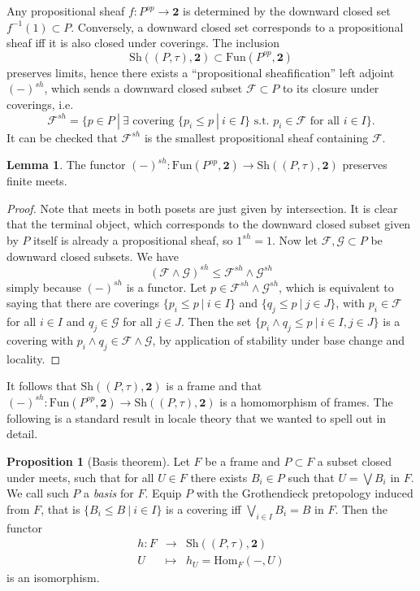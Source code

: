 \documentclass[10pt]{amsart}
\theoremstyle{definition}
\newtheorem{lemma}[theorem]{Lemma}
\newtheorem{proposition}[theorem]{Proposition}
\begin{document}
Any propositional sheaf $f : P^{op} \rightarrow \mathbf{2}$ is determined by the downward closed set $f^{-1}(1) \subset P$. Conversely, a downward closed set corresponds to a propositional sheaf iff it is also closed under coverings. The inclusion
$$\mathrm{Sh}((P,\tau), \mathbf{2}) \subset \mathrm{Fun}(P^{op}, \mathbf{2})$$
preserves limits, hence there exists a ``propositional sheafification'' left adjoint $(-)^{sh}$, which sends a downward closed subset $\mathcal{F} \subset P$ to its closure under coverings, i.e.
$$\mathcal{F}^{sh} = \{p \in P ~|~ \exists \text{ covering } \{p_i \leq p ~|~ i \in I \} \text{ s.t. } p_i \in \mathcal{F} \text{ for all } i \in I \}.$$
It can be checked that $\mathcal{F}^{sh}$ is the smallest propositional sheaf containing $\mathcal{F}$.

\begin{lemma} \label{leftadjointgeometricmorphism}
The functor $(-)^{sh} : \mathrm{Fun}(P^{op}, \mathbf{2}) \rightarrow \mathrm{Sh}((P,\tau), \mathbf{2})$
preserves finite meets.
\end{lemma}

\begin{proof} Note that meets in both posets are just given by intersection. It is clear that the terminal object, which corresponds to the downward closed subset given by $P$ itself is already a propositional sheaf, so $1^{sh} = 1$. Now let $\mathcal{F}, \mathcal{G} \subset P$ be downward closed subsets. We have
$$ ( \mathcal{F}  \wedge \mathcal{G} )^{sh} \leq
\mathcal{F}^{sh} \wedge \mathcal{G}^{sh}  $$
simply because $(-)^{sh}$ is a functor. Let $p \in \mathcal{F}^{sh} \wedge \mathcal{G}^{sh}$, which is equivalent to saying that there are coverings $\{p_i \leq p ~|~ i \in I \}$ and $\{q_j \leq p ~|~ j \in J \}$, with $p_i \in \mathcal{F}$ for all $i \in I$ and $q_j \in \mathcal{G}$ for all $j \in J$. Then the set  $\{p_i \wedge q_j \leq p ~|~ i \in I, j \in J \}$ is a covering with $p_i \wedge q_j \in \mathcal{F}  \wedge \mathcal{G}$, by application of stability under base change and locality.
\end{proof}

It follows that $\mathrm{Sh}((P,\tau), \mathbf{2})$ is a frame and that $(-)^{sh} : \mathrm{Fun}(P^{op}, \mathbf{2}) \rightarrow \mathrm{Sh}((P,\tau), \mathbf{2})$ is a homomorphism of frames. The following is a standard result in locale theory that we wanted to spell out in detail.

\begin{proposition}[Basis theorem] \label{basistheorem}
Let $F$ be a frame and $P \subset F$ a subset closed under meets, such that for all $U \in F$ there exists $B_i \in P$ such that $U = \bigvee B_i$ in $F$. We call such $P$ a \emph{basis} for $F$.  Equip $P$ with the Grothendieck pretopology induced from $F$, that is $\{B_i \leq B ~|~ i \in I \}$ is a covering iff $\bigvee_{i \in I} B_i = B$ in $F$. Then the functor
$$\begin{array}{rcl} h : F & \rightarrow & \mathrm{Sh}((P,\tau), \mathbf{2}) \\
U & \mapsto & h_U = \mathrm{Hom}_F( -, U)
\end{array}$$
is an isomorphism.
\end{proposition}
\end{document}
